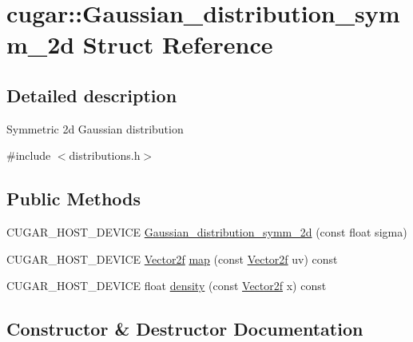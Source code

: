 \hypertarget{structcugar_1_1_gaussian__distribution__symm__2d}{}\section{cugar\+:\+:Gaussian\+\_\+distribution\+\_\+symm\+\_\+2d Struct Reference}
\label{structcugar_1_1_gaussian__distribution__symm__2d}


\subsection{Detailed description}
Symmetric 2d Gaussian distribution 

{\ttfamily \#include $<$distributions.\+h$>$}

\subsection*{Public Methods}
\begin{DoxyCompactItemize}
\item 
C\+U\+G\+A\+R\+\_\+\+H\+O\+S\+T\+\_\+\+D\+E\+V\+I\+CE \hyperlink{structcugar_1_1_gaussian__distribution__symm__2d_a60c1b1e7714a3802f7302128f0d22061}{Gaussian\+\_\+distribution\+\_\+symm\+\_\+2d} (const float sigma)
\item 
C\+U\+G\+A\+R\+\_\+\+H\+O\+S\+T\+\_\+\+D\+E\+V\+I\+CE \hyperlink{structcugar_1_1_vector}{Vector2f} \hyperlink{structcugar_1_1_gaussian__distribution__symm__2d_aed7b256d5d53d1840e68298b6d92bee2}{map} (const \hyperlink{structcugar_1_1_vector}{Vector2f} uv) const
\item 
C\+U\+G\+A\+R\+\_\+\+H\+O\+S\+T\+\_\+\+D\+E\+V\+I\+CE float \hyperlink{structcugar_1_1_gaussian__distribution__symm__2d_a8fdc5e8ef2ffed25026ff5ad69d0d1c5}{density} (const \hyperlink{structcugar_1_1_vector}{Vector2f} x) const
\end{DoxyCompactItemize}


\subsection{Constructor \& Destructor Documentation}
\mbox{\label{structcugar_1_1_gaussian__distribution__symm__2d_a60c1b1e7714a3802f7302128f0d22061}} 
